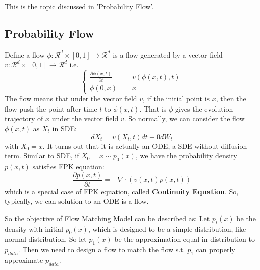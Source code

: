 This is the topic discussed in 'Probability Flow'.
\subsection{Probability Flow}
Define a flow $\phi: \mathcal{R}^d\times [0, 1]\rightarrow \mathcal{R}^d$ is a flow generated by a vector field $v: \mathcal{R}^d \times [0, 1]\rightarrow \mathcal{R}^d$ i.e.
\begin{equation}\left\{
    \begin{aligned}
        \frac{\partial \phi(x, t)}{\partial t} &= v(\phi(x, t), t)\\
        \phi(0, x)&=x
    \end{aligned}\right.
\end{equation}
The flow means that under the vector field $v$, if the initial point is $x$, then the flow push the point after time $t$ to $\phi(x, t)$. That is $\phi$ gives the evolution trajectory of $x$ under the vector field $v$.
So normally, we can consider the flow $\phi(x, t)$ as $X_t$ in SDE:
\begin{equation}
    dX_t = v(X_t, t)dt + 0dW_t
\end{equation}
with $X_0=x$. It turns out that it is actually an ODE, a SDE without diffusion term. Similar to SDE, if $X_0=x\sim p_0(x)$, we have the probability density $p(x, t)$ satisfies FPK equation:
\begin{equation}
    \frac{\partial p(x, t)}{\partial t}=-\nabla\cdot\left(v(x, t)p(x, t)\right)
\end{equation}
which is a special case of FPK equation, called \textbf{Continuity Equation}. So, typically, we can solution to an ODE is a flow.



So the objective of Flow Matching Model can be described as: Let $p_t(x)$ be the density with initial $p_0(x)$, which is designed to be a simple distribution, like normal distribution. 
So let $p_1(x)$ be the approximation equal in distribution to$ p_{data}$. Then we need to design a flow to match the flow s.t. $p_1$ can properly approximate $p_{data}$.
